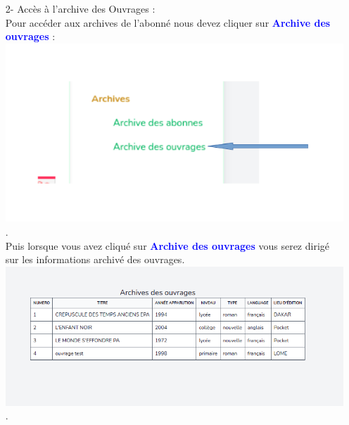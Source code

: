 \documentclass[12pt,a4paper]{article}
\begin{document}
\newpage
\begin{itemize}
\item[2-]Accès à l'archive des Ouvrages : \\
Pour accéder aux archives de l'abonné nous devez cliquer sur \textbf{\textcolor{blue}{Archive des ouvrages}} : \\
\includegraphics[scale=0.5]{end/archiveOuvrage.png}.\\
Puis lorsque vous avez cliqué sur \textbf{\textcolor{blue}{Archive des ouvrages}} vous serez dirigé sur les informations archivé des ouvrages.\\
\includegraphics[scale=0.5]{end/InfoOuvrage.png}.\\
\end{itemize}
\end{document}
